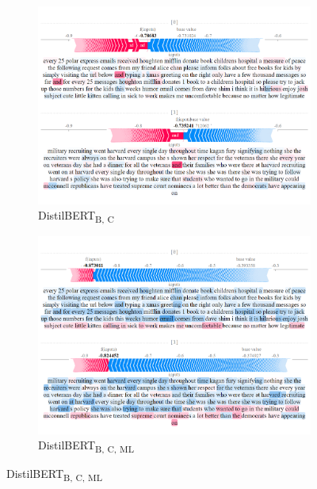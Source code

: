 \begin{figure}[!ht]

    \begin{subfigure}[t]{0.4\textwidth}
        \includegraphics[width=\textwidth]{figs/one_TF/distil-b-c.png}
        \caption{{DistilBERT}\textsubscript{B, C}}
    \end{subfigure}
    \hspace{\fill} %
    \begin{subfigure}[t]{0.4\textwidth}
        \includegraphics[width=\linewidth]{figs/one_TF/bert-b-ml-c.png}
        \caption{{DistilBERT}\textsubscript{B, C, ML}}
    \end{subfigure}


\end{figure}
